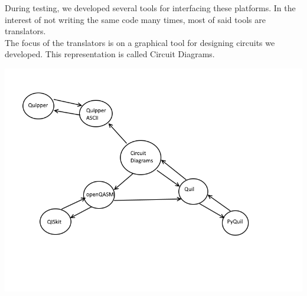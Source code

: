 \documentclass[a4paper,10pt]{article}
\begin{document}
During testing, we developed several tools for interfacing these platforms. In the interest of not writing the same code many times, most of said tools are translators. \\
The focus of the translators is on a graphical tool for designing circuits we developed. This representation is called Circuit Diagrams.

\begin{center}
\includegraphics[width=15cm]{translation}
\end{center}


\printbibliography
\end{document}
